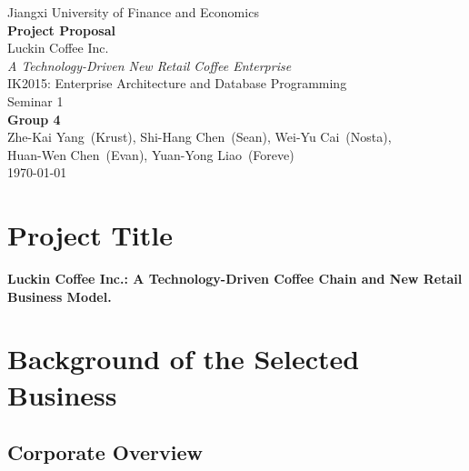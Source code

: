 \documentclass[12pt,a4paper]{article}
\title{}
\author{}
\date{}
\begin{document}
\thispagestyle{empty}
\vspace*{2cm}

\begin{center}
  {\normalsize Jiangxi University of Finance and Economics} \\[2.5cm]

  {\LARGE\bfseries Project Proposal} \\[1.2cm]

  {\Large Luckin Coffee Inc.} \\[0.3cm]
  {\normalsize\itshape A Technology-Driven New Retail Coffee Enterprise} \\[2.5cm]

  {\normalsize IK2015: Enterprise Architecture and Database Programming} \\[0.2cm]
  {\normalsize Seminar 1} \\[2.5cm]

  {\normalsize\textbf{Group 4}} \\[0.5cm]
  {\normalsize
    Zhe-Kai Yang~(Krust),\quad
    Shi-Hang Chen~(Sean),\quad
    Wei-Yu Cai~(Nosta), \\[0.2cm]
    Huan-Wen Chen~(Evan),\quad
    Yuan-Yong Liao~(Foreve)
  } \\[2cm]

  {\normalsize \today}
\end{center}

\newpage
\setcounter{page}{1}
\pagestyle{fancy}

\section{Project Title}
\noindent
\textbf{Luckin Coffee Inc.: A Technology-Driven Coffee Chain and New Retail Business Model.}

\vspace{0.3cm}

\section{Background of the Selected Business}

\subsection{Corporate Overview}
\end{document}
